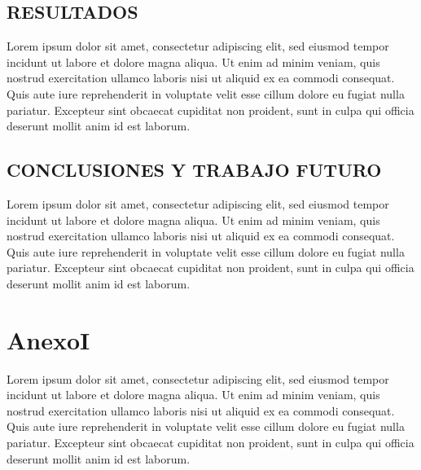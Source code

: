 \documentclass[12pt,a4paper,twoside]{article} %
\begin{document}
\section{RESULTADOS}
Lorem ipsum dolor sit amet, consectetur adipiscing elit, sed eiusmod tempor incidunt ut labore et dolore magna aliqua. Ut enim ad minim veniam, quis nostrud exercitation ullamco laboris nisi ut aliquid ex ea commodi consequat. Quis aute iure reprehenderit in voluptate velit esse cillum dolore eu fugiat nulla pariatur. Excepteur sint obcaecat cupiditat non proident, sunt in culpa qui officia deserunt mollit anim id est laborum.

\section{CONCLUSIONES Y TRABAJO FUTURO}
Lorem ipsum dolor sit amet, consectetur adipiscing elit, sed eiusmod tempor incidunt ut labore et dolore magna aliqua. Ut enim ad minim veniam, quis nostrud exercitation ullamco laboris nisi ut aliquid ex ea commodi consequat. Quis aute iure reprehenderit in voluptate velit esse cillum dolore eu fugiat nulla pariatur. Excepteur sint obcaecat cupiditat non proident, sunt in culpa qui officia deserunt mollit anim id est laborum.


\appendix
\clearpage
\appendixpage
\addappheadtotoc

\chapter{\textbf{AnexoI\\}}
Lorem ipsum dolor sit amet, consectetur adipiscing elit, sed eiusmod tempor incidunt ut labore et dolore magna aliqua. Ut enim ad minim veniam, quis nostrud exercitation ullamco laboris nisi ut aliquid ex ea commodi consequat. Quis aute iure reprehenderit in voluptate velit esse cillum dolore eu fugiat nulla pariatur. Excepteur sint obcaecat cupiditat non proident, sunt in culpa qui officia deserunt mollit anim id est laborum.\\

\end{document}
